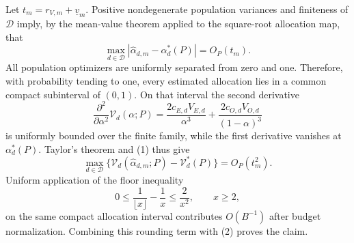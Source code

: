 Let \(t_m=r_{V,m}+\underline v_m\).  Positive nondegenerate population variances and finiteness of \(\mathcal D\) imply, by the mean-value theorem applied to the square-root allocation map, that
\[
 \max_{d\in\mathcal D}|\widehat\alpha_{d,m}-\alpha_d^*(P)|=O_P(t_m). \tag{1}
\]
All population optimizers are uniformly separated from zero and one.  Therefore, with probability tending to one, every estimated allocation lies in a common compact subinterval of \((0,1)\).  On that interval the second derivative
\[
 \frac{\partial^2}{\partial\alpha^2}\mathcal V_d(\alpha;P)
 =\frac{2c_{E,d}V_{E,d}}{\alpha^3}
  +\frac{2c_{O,d}V_{O,d}}{(1-\alpha)^3}
\]
is uniformly bounded over the finite family, while the first derivative vanishes at \(\alpha_d^*(P)\).  Taylor's theorem and (1) thus give
\[
 \max_{d\in\mathcal D}\{\mathcal V_d(\widehat\alpha_{d,m};P)-\mathcal V_d^*(P)\}
 =O_P(t_m^2). \tag{2}
\]
Uniform application of the floor inequality
\[
 0\le \frac1{\lfloor x\rfloor}-\frac1x\le\frac2{x^2},\qquad x\ge2,
\]
on the same compact allocation interval contributes \(O(B^{-1})\) after budget normalization.  Combining this rounding term with (2) proves the claim.